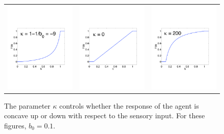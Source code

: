 \documentclass[12pt]{article}
\begin{document}
\begin{figure}[htp]
\begin{tabular}{ccc}
	\includegraphics[width=2.25in]{figures/Fconcaveup.pdf} & \includegraphics[width=2.25in]{figures/Flinear.pdf} & \includegraphics[width=2.25in]{figures/Fconcavedown.pdf}
\end{tabular}
\caption{The parameter $\kappa$ controls whether the response of the agent is concave up or down with respect to the sensory input. For these figures, $b_0 = 0.1$.}
\label{fig:exampleF}
\end{figure}
\end{document}

